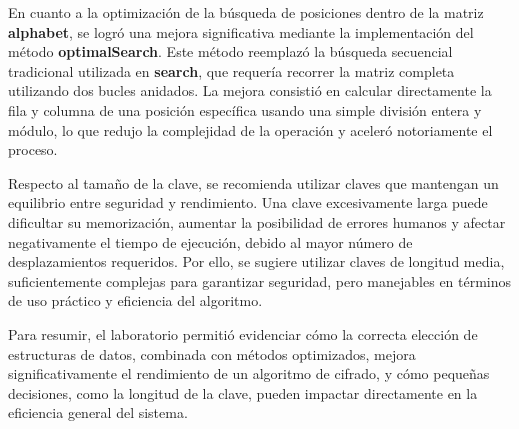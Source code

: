 \documentclass[12pt]{article}
\begin{document}
En cuanto a la optimización de la búsqueda de posiciones dentro de la matriz \textbf{alphabet}, se logró una mejora significativa mediante la implementación del método \textbf{optimalSearch}. Este método reemplazó la búsqueda secuencial tradicional utilizada en \textbf{search}, que requería recorrer la matriz completa utilizando dos bucles anidados. La mejora consistió en calcular directamente la fila y columna de una posición específica usando una simple división entera y módulo, lo que redujo la complejidad de la operación y aceleró notoriamente el proceso.

Respecto al tamaño de la clave, se recomienda utilizar claves que mantengan un equilibrio entre seguridad y rendimiento. Una clave excesivamente larga puede dificultar su memorización, aumentar la posibilidad de errores humanos y afectar negativamente el tiempo de ejecución, debido al mayor número de desplazamientos requeridos. Por ello, se sugiere utilizar claves de longitud media, suficientemente complejas para garantizar seguridad, pero manejables en términos de uso práctico y eficiencia del algoritmo.

Para resumir, el laboratorio permitió evidenciar cómo la correcta elección de estructuras de datos, combinada con métodos optimizados, mejora significativamente el rendimiento de un algoritmo de cifrado, y cómo pequeñas decisiones, como la longitud de la clave, pueden impactar directamente en la eficiencia general del sistema.
\end{document}
